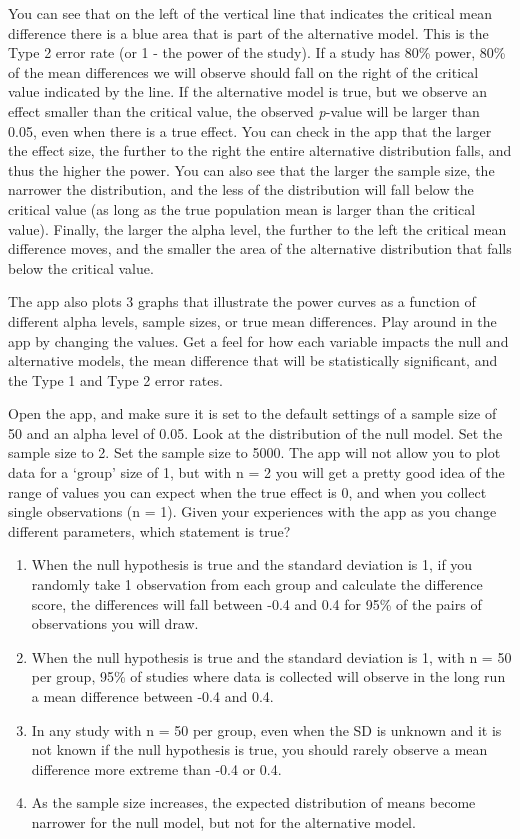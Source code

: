 \documentclass[
  oneside]{krantz}
\providecommand{\tightlist}{%
  \setlength{\itemsep}{0pt}\setlength{\parskip}{0pt}}
\begin{document}
You can see that on the left of the vertical line that indicates the critical mean difference there is a blue area that is part of the alternative model. This is the Type 2 error rate (or 1 - the power of the study). If a study has 80\% power, 80\% of the mean differences we will observe should fall on the right of the critical value indicated by the line. If the alternative model is true, but we observe an effect smaller than the critical value, the observed \emph{p}-value will be larger than 0.05, even when there is a true effect. You can check in the app that the larger the effect size, the further to the right the entire alternative distribution falls, and thus the higher the power. You can also see that the larger the sample size, the narrower the distribution, and the less of the distribution will fall below the critical value (as long as the true population mean is larger than the critical value). Finally, the larger the alpha level, the further to the left the critical mean difference moves, and the smaller the area of the alternative distribution that falls below the critical value.

The app also plots 3 graphs that illustrate the power curves as a function of different alpha levels, sample sizes, or true mean differences. Play around in the app by changing the values. Get a feel for how each variable impacts the null and alternative models, the mean difference that will be statistically significant, and the Type 1 and Type 2 error rates.

Open the app, and make sure it is set to the default settings of a sample size of 50 and an alpha level of 0.05. Look at the distribution of the null model. Set the sample size to 2. Set the sample size to 5000. The app will not allow you to plot data for a `group' size of 1, but with n = 2 you will get a pretty good idea of the range of values you can expect when the true effect is 0, and when you collect single observations (n = 1). Given your experiences with the app as you change different parameters, which statement is true?

\begin{enumerate}
\def\labelenumi{\Alph{enumi})}
\tightlist
\item
  When the null hypothesis is true and the standard deviation is 1, if you randomly take 1 observation from each group and calculate the difference score, the differences will fall between -0.4 and 0.4 for 95\% of the pairs of observations you will draw.
\item
  When the null hypothesis is true and the standard deviation is 1, with n = 50 per group, 95\% of studies where data is collected will observe in the long run a mean difference between -0.4 and 0.4.
\item
  In any study with n = 50 per group, even when the SD is unknown and it is not known if the null hypothesis is true, you should rarely observe a mean difference more extreme than -0.4 or 0.4.
\item
  As the sample size increases, the expected distribution of means become narrower for the null model, but not for the alternative model.
\end{enumerate}
\end{document}
